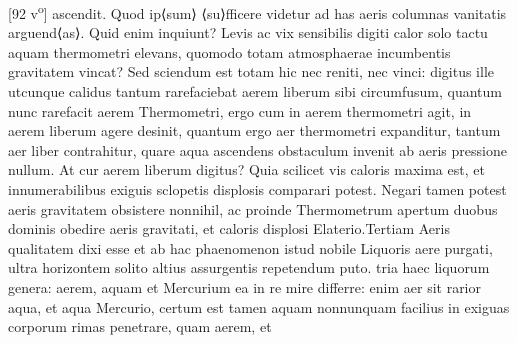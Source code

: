 [92 v\textsuperscript{o}] ascendit. Quod ip⟨sum⟩ ⟨su⟩fficere videtur ad has aeris columnas  vanitatis arguend⟨as⟩. Quid enim inquiunt? Levis ac vix  sensibilis digiti calor\protect{} solo tactu aquam thermometri\protect{} elevans,  quomodo totam atmosphaerae\protect{} incumbentis gravitatem\protect{}  vincat? Sed sciendum est  totam hic nec reniti, nec vinci: digitus ille utcunque  calidus tantum  rarefaciebat aerem liberum sibi circumfusum,  quantum nunc rarefacit aerem Thermometri\protect{}, ergo cum in  aerem thermometri\protect{} agit, in aerem  liberum agere desinit, quantum ergo aer thermometri\protect{}  expanditur, tantum aer liber contrahitur, quare aqua ascendens  obstaculum invenit ab aeris pressione\protect{} nullum. At cur aerem liberum   digitus? Quia scilicet vis caloris\protect{} maxima est, et innumerabilibus  exiguis sclopetis\protect{} displosis comparari potest. Negari tamen  potest aeris gravitatem\protect{} obsistere nonnihil, ac proinde Thermometrum\protect{} apertum duobus dominis obedire aeris gravitati\protect{},  et caloris\protect{} displosi Elaterio\protect{}.\pend \pstart  Tertiam Aeris qualitatem dixi esse  et ab  hac phaenomenon istud nobile Liquoris\protect{} aere purgati,  ultra horizontem solito altius assurgentis repetendum  puto.   tria haec liquorum genera: aerem, aquam et Mercurium\protect{}  ea in re mire differre:  enim aer sit rarior aqua,  et aqua Mercurio\protect{}, certum est tamen aquam nonnunquam facilius  in exiguas corporum rimas penetrare, quam aerem, et 